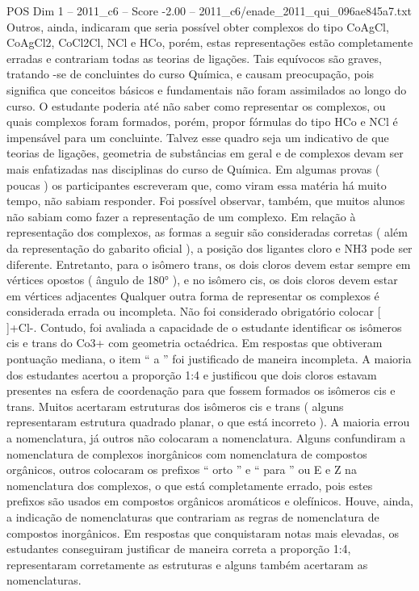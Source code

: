 \begin{textsample}{POS Dim 1 – 2011\_c6 – Score -2.00 – 2011\_c6/enade\_2011\_qui\_096ae845a7.txt}
Outros, ainda, indicaram que seria possível obter complexos do tipo CoAgCl, CoAgCl2, CoCl2Cl, NCl e HCo, porém, estas representações estão completamente erradas e contrariam todas as teorias de ligações.
Tais equívocos são graves, tratando -se de concluintes do curso Química, e causam preocupação, pois significa que conceitos básicos e fundamentais não foram assimilados ao longo do curso.
O estudante poderia até não saber como representar os complexos, ou quais complexos foram formados, porém, propor fórmulas do tipo HCo e NCl é impensável para um concluinte.
Talvez esse quadro seja um indicativo de que teorias de ligações, geometria de substâncias em geral e de complexos devam ser mais enfatizadas nas disciplinas do curso de Química.
Em algumas provas ( poucas ) os participantes escreveram que, como viram essa matéria há muito tempo, não sabiam responder.
Foi possível observar, também, que muitos alunos não sabiam como fazer a representação de um complexo.
Em relação à representação dos complexos, as formas a seguir são consideradas corretas ( além da representação do gabarito oficial ), a posição dos ligantes cloro e NH3 pode ser diferente.
Entretanto, para o isômero trans, os dois cloros devem estar sempre em vértices opostos ( ângulo de 180{\EmojiFont °} ), e no isômero cis, os dois cloros devem estar em vértices adjacentes Qualquer outra forma de representar os complexos é considerada errada ou incompleta.
Não foi considerado obrigatório colocar [ ]+Cl-.
Contudo, foi avaliada a capacidade de o estudante identificar os isômeros cis e trans do Co3+ com geometria octaédrica.
Em respostas que obtiveram pontuação mediana, o item “ a ” foi justificado de maneira incompleta.
A maioria dos estudantes acertou a proporção 1:4 e justificou que dois cloros estavam presentes na esfera de coordenação para que fossem formados os isômeros cis e trans.
Muitos acertaram estruturas dos isômeros cis e trans ( alguns representaram estrutura quadrado planar, o que está incorreto ).
A maioria errou a nomenclatura, já outros não colocaram a nomenclatura.
Alguns confundiram a nomenclatura de complexos inorgânicos com nomenclatura de compostos orgânicos, outros colocaram os prefixos “ orto ” e “ para ” ou E e Z na nomenclatura dos complexos, o que está completamente errado, pois estes prefixos são usados em compostos orgânicos aromáticos e olefínicos.
Houve, ainda, a indicação de nomenclaturas que contrariam as regras de nomenclatura de compostos inorgânicos.
Em respostas que conquistaram notas mais elevadas, os estudantes conseguiram justificar de maneira correta a proporção 1:4, representaram corretamente as estruturas e alguns também acertaram as nomenclaturas.

\end{textsample}
